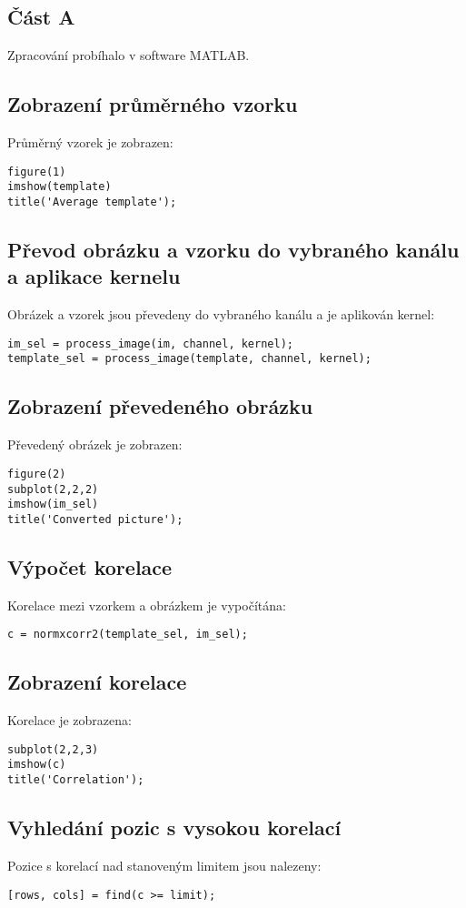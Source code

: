 
\subsection*{Část A}
Zpracování probíhalo v software MATLAB.


\subsection*{Zobrazení průměrného vzorku}
Průměrný vzorek je zobrazen:
\begin{verbatim}
figure(1)
imshow(template)
title('Average template');
\end{verbatim}

\subsection*{Převod obrázku a vzorku do vybraného kanálu a aplikace kernelu}
Obrázek a vzorek jsou převedeny do vybraného kanálu a je aplikován kernel:
\begin{verbatim}
im_sel = process_image(im, channel, kernel);
template_sel = process_image(template, channel, kernel);
\end{verbatim}

\subsection*{Zobrazení převedeného obrázku}
Převedený obrázek je zobrazen:
\begin{verbatim}
figure(2)
subplot(2,2,2)
imshow(im_sel)
title('Converted picture');
\end{verbatim}

\subsection*{Výpočet korelace}
Korelace mezi vzorkem a obrázkem je vypočítána:
\begin{verbatim}
c = normxcorr2(template_sel, im_sel);
\end{verbatim}

\subsection*{Zobrazení korelace}
Korelace je zobrazena:
\begin{verbatim}
subplot(2,2,3)
imshow(c)
title('Correlation');
\end{verbatim}

\subsection*{Vyhledání pozic s vysokou korelací}
Pozice s korelací nad stanoveným limitem jsou nalezeny:
\begin{verbatim}
[rows, cols] = find(c >= limit);
\end{verbatim}


